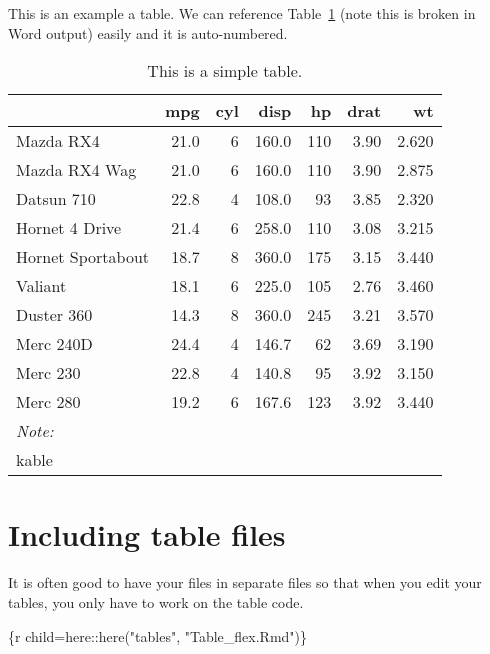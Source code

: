 \documentclass[
  letterpaper,
  oneside]{scrbook}
\newenvironment{Shaded}{\begin{snugshade}}{\end{snugshade}}
\newcommand{\InformationTok}[1]{\textcolor[rgb]{0.37,0.37,0.37}{#1}}
\begin{document}
This is an example a table. We can reference Table~\ref{tbl-example}
(note this is broken in Word output) easily and it is auto-numbered.

\hypertarget{tbl-example}{}
\begin{table}
\caption{\label{tbl-example}This is a simple table. }\tabularnewline

\centering
\begin{tabular}[t]{lrrrrrr}
\toprule
  & mpg & cyl & disp & hp & drat & wt\\
\midrule
Mazda RX4 & 21.0 & 6 & 160.0 & 110 & 3.90 & 2.620\\
Mazda RX4 Wag & 21.0 & 6 & 160.0 & 110 & 3.90 & 2.875\\
Datsun 710 & 22.8 & 4 & 108.0 & 93 & 3.85 & 2.320\\
Hornet 4 Drive & 21.4 & 6 & 258.0 & 110 & 3.08 & 3.215\\
Hornet Sportabout & 18.7 & 8 & 360.0 & 175 & 3.15 & 3.440\\
\addlinespace
Valiant & 18.1 & 6 & 225.0 & 105 & 2.76 & 3.460\\
Duster 360 & 14.3 & 8 & 360.0 & 245 & 3.21 & 3.570\\
Merc 240D & 24.4 & 4 & 146.7 & 62 & 3.69 & 3.190\\
Merc 230 & 22.8 & 4 & 140.8 & 95 & 3.92 & 3.150\\
Merc 280 & 19.2 & 6 & 167.6 & 123 & 3.92 & 3.440\\
\bottomrule
\multicolumn{7}{l}{\rule{0pt}{1em}\textit{Note: }}\\
\multicolumn{7}{l}{\rule{0pt}{1em}kable}\\
\end{tabular}
\end{table}

\hypertarget{including-table-files}{%
\section{Including table files}\label{including-table-files}}

It is often good to have your files in separate files so that when you
edit your tables, you only have to work on the table code.

\begin{Shaded}
\begin{Highlighting}[]
\InformationTok{\textasciigrave{}\textasciigrave{}\textasciigrave{}\{r child=here::here("tables", "Table\_flex.Rmd")\}}
\InformationTok{\textasciigrave{}\textasciigrave{}\textasciigrave{}}
\end{Highlighting}
\end{Shaded}
\end{document}
